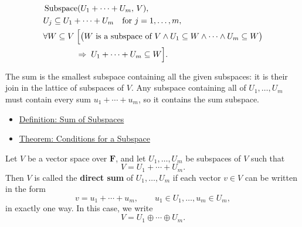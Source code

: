 \begin{remark*}
\[
\begin{aligned}
&\operatorname{Subspace}(U_1+\cdots+U_m,\,V), \\
&U_j \subseteq U_1+\cdots+U_m \quad \text{for } j=1,\dots,m, \\
&\forall W \subseteq V\;
\Bigl[
\bigl(W \text{ is a subspace of } V
\land U_1 \subseteq W \land \cdots \land U_m \subseteq W\bigr) \\
&\qquad\qquad\Rightarrow\;
U_1+\cdots+U_m \subseteq W
\Bigr].
\end{aligned}
\]
\end{remark*}

\begin{remark*}[Interpretation]
The sum is the smallest subspace containing all the given subspaces: it is
their join in the lattice of subspaces of $V$. Any subspace containing all
of $U_1,\ldots,U_m$ must contain every sum $u_1+\cdots+u_m$, so it
contains the sum subspace.
\end{remark*}

\begin{remark*}[Dependencies]
\begin{itemize}
  \item \hyperref[def:sum-of-subspaces]{Definition: Sum of Subspaces}
  \item \hyperref[thm:conditions-for-a-subspace]{Theorem: Conditions for a Subspace}
\end{itemize}
\end{remark*}


\begin{tcolorbox}[colback=defbox, colframe=defborder, arc=2pt,
  left=6pt, right=6pt, top=4pt, bottom=4pt,
  title={\small\textbf{Definition (Direct Sum)}},
  fonttitle=\small\bfseries]
\begin{definition}
\label{def:direct-sum}
Let $V$ be a vector space over $\mathbf{F}$, and let
$U_1,\dots,U_m$ be subspaces of $V$ such that
\[
V=U_1+\cdots+U_m.
\]
Then $V$ is called the \textbf{direct sum} of $U_1,\dots,U_m$ if each
vector $v \in V$ can be written in the form
\[
v=u_1+\cdots+u_m,
\qquad
u_1 \in U_1,\dots,u_m \in U_m,
\]
in exactly one way.
In this case, we write
\[
V=U_1\oplus\cdots\oplus U_m.
\]
\end{definition}
\end{tcolorbox}

